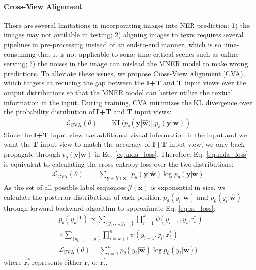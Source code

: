 \documentclass[11pt]{article}
\newcommand{\mcL}{\mathcal{L}}
\newcommand{\mcY}{\mathcal{Y}}
\def\vr{{\bm{r}}}
\def\vw{{\bm{w}}}
\def\vx{{\bm{x}}}
\def\vy{{\bm{y}}}
\def\evy{{y}}
\begin{document}
\paragraph{Cross-View Alignment}
There are several limitations in incorporating images into NER prediction: 1) the images may not available in testing; 2) aligning images to texts requires several pipelines in pre-processing instead of an end-to-end manner, which is so time-consuming that it is not applicable to some time-critical scenes such as online serving; 3) the noises in the image can mislead the MNER model to make wrong predictions. To alleviate these issues, we propose Cross-View Alignment (CVA), which targets at reducing the gap between the \textbf{I+T} and \textbf{T} input views over the output distributions so that the MNER model can better utilize the textual information in the input.
During training, CVA minimizes the KL divergence over the probability distribution of \textbf{I+T} and \textbf{T} input views:
\begin{align}
\mcL_{\text{CVA}}(\theta)&{=}\text{KL}(p_\theta(\vy|\hat{\vw})||p_\theta(\vy|\vw)) \label{eq:mda_loss}
\end{align}
Since the \textbf{I+T} input view has additional visual information in the input and we want the \textbf{T} input view to match the accuracy of \textbf{I+T} input view, we only back-propagate through $p_\theta(\vy|\vw)$ in Eq. \ref{eq:mda_loss}. Therefore, Eq. \ref{eq:mda_loss} is equivalent to calculating the cross-entropy loss over the two distributions:
\begin{align}
\mcL_{\text{CVA}}(\theta)&{=}\sum_{\vy \in \mcY(\vx)} p_\theta(\vy|\hat{\vw}) \log p_\theta(\vy|\vw) \label{eq:xe_loss}
\end{align}
As the set of all possible label sequences $ \mcY(\vx)$ is exponential in size, we calculate the posterior distributions of each position $p_\theta(\evy_i|\vw)$ and $p_\theta(\evy_i|\hat{\vw})$ through forward-backward algorithm to approximate Eq. \ref{eq:xe_loss}:
\begin{align}
&p_\theta(\evy_k|*) {\propto} \sum\limits_{\{y_0,\dots,y_{k-1}\}} {\prod\limits_{i=1}^{k}} \psi(y_{i-1}, y_i, \vr^*_i) \nonumber\\
&{\times} \sum\limits_{\{y_{k{+}1},\dots,y_n\}} {\prod\limits_{i{=}k{+}1}^{n}} \psi(y_{i{-}1}, y_i, \vr^*_i) \nonumber \\
&\mcL_{\text{CVA}}(\theta){=}\sum_{i=1}^n p_\theta(\evy_i|\hat{\vw}) \log p_\theta(\evy_i|\vw)) \label{eq:mda} 
\end{align}
where $\vr^*_i$ represents either $\vr_i$ or $\vr_i^\prime$.
\end{document}
